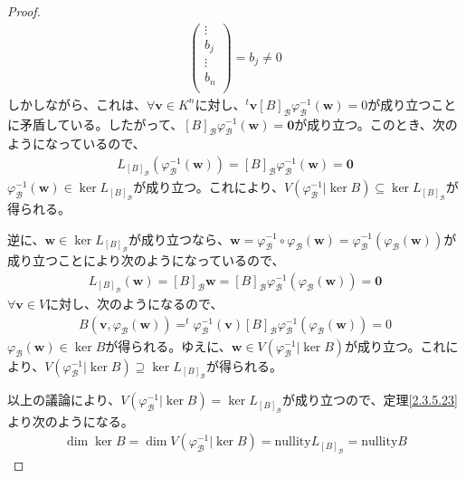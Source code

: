 \documentclass[dvipdfmx]{jsarticle}
\begin{document}
\begin{proof}
\begin{align*}
\begin{pmatrix}
 \vdots \\
b_{j} \\
 \vdots \\
b_{n} \\
\end{pmatrix} = b_{j} \neq 0
\end{align*}
しかしながら、これは、$\forall\mathbf{v} \in K^{n}$に対し、$^{t}\mathbf{v}[ B]_{\mathcal{B}}\varphi_{\mathcal{B}}^{- 1}\left( \mathbf{w} \right) = 0$が成り立つことに矛盾している。したがって、$[ B]_{\mathcal{B}}\varphi_{\mathcal{B}}^{- 1}\left( \mathbf{w} \right) = \mathbf{0}$が成り立つ。このとき、次のようになっているので、
\begin{align*}
L_{[ B]_{\mathcal{B}}}\left( \varphi_{\mathcal{B}}^{- 1}\left( \mathbf{w} \right) \right) = [ B]_{\mathcal{B}}\varphi_{\mathcal{B}}^{- 1}\left( \mathbf{w} \right) = \mathbf{0}
\end{align*}
$\varphi_{\mathcal{B}}^{- 1}\left( \mathbf{w} \right) \in \ker L_{[ B]_{\mathcal{B}}}$が成り立つ。これにより、$V\left( \varphi_{\mathcal{B}}^{- 1}|\ker B \right) \subseteq \ker L_{[ B]_{\mathcal{B}}}$が得られる。\par
逆に、$\mathbf{w} \in \ker L_{[ B]_{\mathcal{B}}}$が成り立つなら、$\mathbf{w} = \varphi_{\mathcal{B}}^{- 1} \circ \varphi_{\mathcal{B}}\left( \mathbf{w} \right) = \varphi_{\mathcal{B}}^{- 1}\left( \varphi_{\mathcal{B}}\left( \mathbf{w} \right) \right)$が成り立つことにより次のようになっているので、
\begin{align*}
L_{[ B]_{\mathcal{B}}}\left( \mathbf{w} \right) = [ B]_{\mathcal{B}}\mathbf{w} = [ B]_{\mathcal{B}}\varphi_{\mathcal{B}}^{- 1}\left( \varphi_{\mathcal{B}}\left( \mathbf{w} \right) \right) = \mathbf{0}
\end{align*}
$\forall\mathbf{v} \in V$に対し、次のようになるので、
\begin{align*}
B\left( \mathbf{v},\varphi_{\mathcal{B}}\left( \mathbf{w} \right) \right) =^{t}\varphi_{\mathcal{B}}^{- 1}\left( \mathbf{v} \right)[ B]_{\mathcal{B}}\varphi_{\mathcal{B}}^{- 1}\left( \varphi_{\mathcal{B}}\left( \mathbf{w} \right) \right) = 0
\end{align*}
$\varphi_{\mathcal{B}}\left( \mathbf{w} \right) \in \ker B$が得られる。ゆえに、$\mathbf{w} \in V\left( \varphi_{\mathcal{B}}^{- 1}|\ker B \right)$が成り立つ。これにより、$V\left( \varphi_{\mathcal{B}}^{- 1}|\ker B \right) \supseteq \ker L_{[ B]_{\mathcal{B}}}$が得られる。\par
以上の議論により、$V\left( \varphi_{\mathcal{B}}^{- 1}|\ker B \right) = \ker L_{[ B]_{\mathcal{B}}}$が成り立つので、定理\ref{2.3.5.23}より次のようになる。
\begin{align*}
\dim{\ker B} = \dim{V\left( \varphi_{\mathcal{B}}^{- 1}|\ker B \right)} = {\mathrm{nullity}}L_{[ B]_{\mathcal{B}}} = {\mathrm{nullity}}B
\end{align*}
\end{proof}
\end{document}
